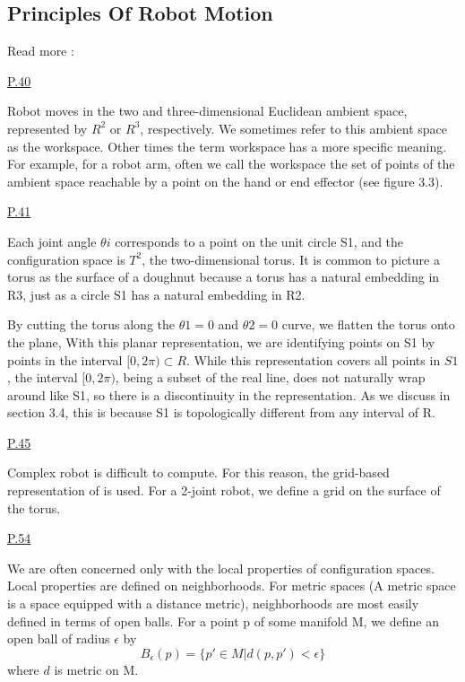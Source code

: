 \subsection{Principles Of Robot Motion}
Read more : \cite{choset2005principles}

\noindent \underline{P.40}

Robot moves in the two and three-dimensional Euclidean ambient space, represented by $R^2$ or $R^3$, respectively. We sometimes refer to this ambient space as the workspace. Other times the term workspace has a more specific meaning. For example, for a robot arm, often we call the workspace the set of points of the ambient space reachable by a point on the hand or end effector (see figure 3.3).

\noindent \underline{P.41}

Each joint angle $\theta i$ corresponds to a point on the unit circle S1, and the configuration space is $T^2$, the two-dimensional torus. It is common to picture a torus as the surface of a doughnut because a torus has a natural embedding in R3, just as a circle S1 has a natural embedding in R2.

By cutting the torus along the $\theta1=0$ and $\theta2=0$ curve, we flatten the torus onto the plane, With this planar representation, we are identifying points on S1 by points in the interval $[0, 2\pi) \subset R$. While this representation covers all points in $S1$, the interval $[0, 2\pi)$, being a subset of the real line, does not naturally wrap around like S1, so there is a discontinuity in the representation. As we discuss in section 3.4, this is because S1 is topologically different from any interval of R.

\noindent \underline{P.45}

Complex robot \cs is difficult to compute. For this reason, the grid-based representation of \cs is used. For a 2-joint robot, we define a grid on the surface of the torus.

\noindent \underline{P.54}

We are often concerned only with the local properties of configuration spaces. Local properties are defined on neighborhoods. For metric spaces (A metric space is a space equipped with a distance metric), neighborhoods are most easily defined in terms of open balls. For a point p of some manifold M, we define an open ball of radius $\epsilon$ by
\begin{equation}
    B_\epsilon(p) = \{p'\in M | d(p,p') < \epsilon\}
\end{equation}
where $d$ is metric on M.

